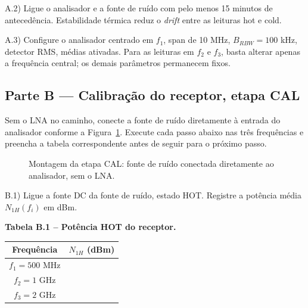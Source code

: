 \documentclass[11pt,a4paper]{article}
\begin{document}
A.2) Ligue o analisador e a fonte de ruído com pelo menos 15 minutos de antecedência. Estabilidade térmica reduz o \emph{drift} entre as leituras hot e cold.

A.3) Configure o analisador centrado em $f_1$, span de 10 MHz, $B_{RBW} = 100$ kHz, detector RMS, médias ativadas. Para as leituras em $f_2$ e $f_3$, basta alterar apenas a frequência central; os demais parâmetros permanecem fixos.

\subsection*{Parte B --- Calibração do receptor, etapa CAL}

Sem o LNA no caminho, conecte a fonte de ruído diretamente à entrada do analisador conforme a Figura~\ref{fig:cal}. Execute cada passo abaixo nas três frequências e preencha a tabela correspondente antes de seguir para o próximo passo.

\begin{figure}[H]
\centering
{}
\caption{Montagem da etapa CAL: fonte de ruído conectada diretamente ao analisador, sem o LNA.}
\label{fig:cal}
\end{figure}

B.1) Ligue a fonte DC da fonte de ruído, estado HOT. Registre a potência média $N_{1H}(f_i)$ em dBm.

\textbf{Tabela B.1 -- Potência HOT do receptor.}

{\renewcommand{\arraystretch}{1.5}
\begin{center}
\begin{tabular}{|c|c|}
\hline
\textbf{Frequência} & \textbf{$N_{1H}$ (dBm)} \\
\hline
$f_1 = 500$ MHz & \\
\hline
$f_2 = 1$ GHz & \\
\hline
$f_3 = 2$ GHz & \\
\hline
\end{tabular}
\end{center}
}
\end{document}
